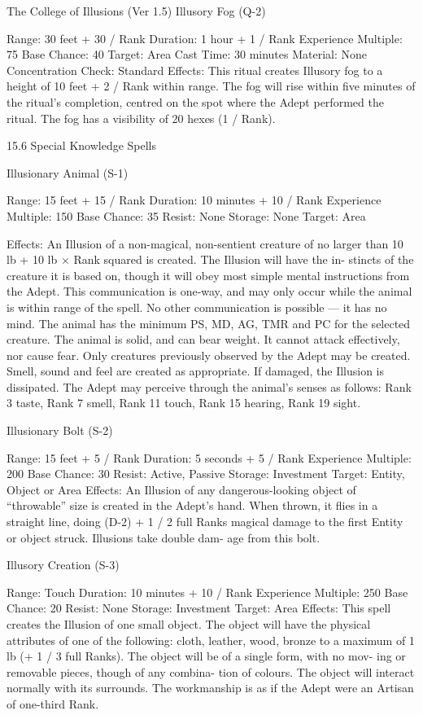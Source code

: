 \begin{Chapter}{The College of Illusions (Ver 1.5)}
Illusory Fog (Q-2) 

Range: 30 feet + 30 / Rank 
Duration: 1 hour + 1 / Rank 
Experience Multiple: 75 
Base Chance: 40%
Target: Area 
Cast Time: 30 minutes 
Material: None 
Concentration Check: Standard 
Effects:  This  ritual  creates  Illusory  fog  to  a  height 
of  10  feet  +  2  /  Rank  within  range.  The  fog  will 
rise within five minutes of the ritual’s completion, 
centred on the spot where the Adept performed the 
ritual.  The  fog  has  a  visibility  of  20  hexes  (1  / 
Rank). 

15.6 Special Knowledge Spells 

Illusionary Animal (S-1) 

Range: 15 feet + 15 / Rank 
Duration: 10 minutes + 10 / Rank 
Experience Multiple: 150 
Base Chance: 35%
Resist: None 
Storage: None 
Target: Area 

Effects: An Illusion of a non-magical, non-sentient 
creature  of  no  larger  than  10  lb  +  10  lb  ×  Rank 
squared  is  created.  The  Illusion  will  have  the  in-
stincts of the creature it is based on, though it will 
obey  most  simple  mental  instructions  from  the 
Adept.  This  communication  is  one-way,  and  may 
only occur while the animal is within range of the 
spell. No other communication is possible — it has 
no  mind.  The  animal  has  the  minimum  PS,  MD, 
AG,  TMR  and  PC  for  the  selected  creature.  The 
animal  is  solid,  and  can  bear  weight.  It  cannot 
attack  effectively,  nor  cause  fear.  Only  creatures 
previously  observed  by  the  Adept  may  be  created. 
Smell, sound and feel are created as appropriate. If 
damaged, the Illusion is dissipated. The Adept may 
perceive  through  the  animal’s  senses  as  follows: 
Rank  3  taste,  Rank  7  smell,  Rank  11  touch,  Rank 
15 hearing, Rank 19 sight. 

Illusionary Bolt (S-2) 

Range: 15 feet + 5 / Rank 
Duration: 5 seconds + 5 / Rank 
Experience Multiple: 200 
Base Chance: 30%
Resist: Active, Passive 
Storage: Investment 
Target: Entity, Object or Area 
Effects:  An  Illusion  of  any  dangerous-looking 
object of “throwable” size is created in the Adept’s 
hand. When thrown, it flies in a straight line, doing 
(D-2) + 1 / 2 full Ranks magical damage to the first 
Entity  or  object  struck.  Illusions  take  double  dam-
age from this bolt. 

Illusory Creation (S-3) 

Range: Touch 
Duration: 10 minutes + 10 / Rank 
Experience Multiple: 250 
Base Chance: 20%
Resist: None 
Storage: Investment 
Target: Area 
Effects: This spell creates the Illusion of one small 
object. The object will have the physical attributes 
of  one  of  the  following:  cloth,  leather,  wood, 
bronze  to a maximum of 1 lb (+ 1 / 3 full Ranks). 
The  object  will  be  of  a  single  form,  with  no  mov-
ing  or  removable  pieces,  though  of  any  combina-
tion  of  colours.  The  object  will  interact  normally 
with  its  surrounds.  The  workmanship  is  as  if  the 
Adept were an Artisan of one-third Rank. 


\end{Chapter}
